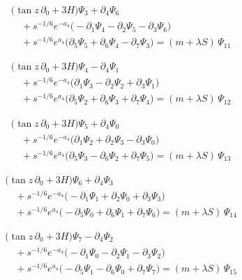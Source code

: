 \documentclass[11pt]{article}
\begin{document}
\[
\begin{aligned}
&\bigl(\tan z\,\partial_{0}+3H\bigr)\Psi_{3}+\partial_{4}\Psi_{6} \\
&\quad +s^{-1/6}e^{-a_4}\bigl(-\partial_{1}\Psi_{4}-\partial_{2}\Psi_{5}-\partial_{3}\Psi_{6}\bigr) \\
&\quad +s^{-1/6}e^{a_4}\bigl(\partial_{5}\Psi_{5}+\partial_{6}\Psi_{4}-\partial_{7}\Psi_{3}\bigr)=(m+\lambda S)\,\Psi_{11}
\end{aligned}\tag{E11}
\]

\[
\begin{aligned}
&\bigl(\tan z\,\partial_{0}+3H\bigr)\Psi_{4}-\partial_{4}\Psi_{1} \\
&\quad +s^{-1/6}e^{-a_4}\bigl(\partial_{1}\Psi_{3}-\partial_{2}\Psi_{2}+\partial_{3}\Psi_{1}\bigr) \\
&\quad +s^{-1/6}e^{a_4}\bigl(\partial_{5}\Psi_{2}+\partial_{6}\Psi_{3}+\partial_{7}\Psi_{4}\bigr)=(m+\lambda S)\,\Psi_{12}
\end{aligned}\tag{E12}
\]

\[
\begin{aligned}
&\bigl(\tan z\,\partial_{0}+3H\bigr)\Psi_{5}+\partial_{4}\Psi_{0} \\
&\quad +s^{-1/6}e^{-a_4}\bigl(\partial_{1}\Psi_{2}+\partial_{2}\Psi_{3}-\partial_{3}\Psi_{0}\bigr) \\
&\quad +s^{-1/6}e^{a_4}\bigl(\partial_{5}\Psi_{3}-\partial_{6}\Psi_{2}+\partial_{7}\Psi_{5}\bigr)=(m+\lambda S)\,\Psi_{13}
\end{aligned}\tag{E13}
\]

\[
\begin{aligned}
&\bigl(\tan z\,\partial_{0}+3H\bigr)\Psi_{6}+\partial_{4}\Psi_{3} \\
&\quad +s^{-1/6}e^{-a_4}\bigl(-\partial_{1}\Psi_{1}+\partial_{2}\Psi_{0}+\partial_{3}\Psi_{3}\bigr) \\
&\quad +s^{-1/6}e^{a_4}\bigl(-\partial_{5}\Psi_{0}+\partial_{6}\Psi_{1}+\partial_{7}\Psi_{6}\bigr)=(m+\lambda S)\,\Psi_{14}
\end{aligned}\tag{E14}
\]

\[
\begin{aligned}
&\bigl(\tan z\,\partial_{0}+3H\bigr)\Psi_{7}-\partial_{4}\Psi_{2} \\
&\quad +s^{-1/6}e^{-a_4}\bigl(-\partial_{1}\Psi_{0}-\partial_{2}\Psi_{1}-\partial_{3}\Psi_{2}\bigr) \\
&\quad +s^{-1/6}e^{a_4}\bigl(-\partial_{5}\Psi_{1}-\partial_{6}\Psi_{0}+\partial_{7}\Psi_{7}\bigr)=(m+\lambda S)\,\Psi_{15}
\end{aligned}\tag{E15}
\]
\end{document}
